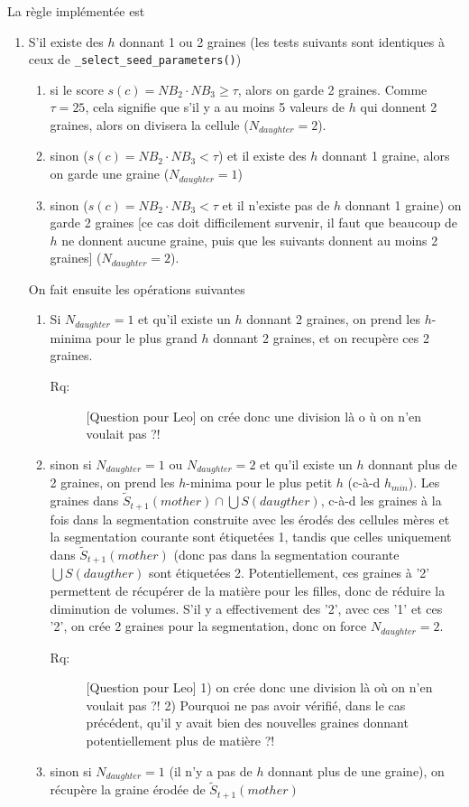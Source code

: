 \documentclass{article}
\newenvironment{remarque}{\color{red}\begin{description}\item[Rq:]}
{\end{description}\color{black}}
\begin{document}
La r\`egle impl\'ement\'ee est 
\begin{enumerate}
\itemsep -0.5ex
\item S'il existe des $h$ donnant 1 ou 2 graines (les tests suivants sont identiques \`a ceux de \verb|_select_seed_parameters()|)
\begin{enumerate}
\itemsep -0.5ex
\item si le score $s(c) = NB_2 \cdot NB_3 \geq \tau$, alors on garde 2 graines. Comme $\tau = 25$, cela signifie que s'il y a au moins 5 valeurs de $h$ qui donnent 2 graines, alors on divisera la cellule ($N_{daughter}=2$).
\item sinon ($s(c) = NB_2 \cdot NB_3 <\tau$) et il existe des $h$ donnant 1 graine, alors on garde une graine ($N_{daughter}=1$)
\item sinon ($s(c) = NB_2 \cdot NB_3 <\tau$ et il n'existe pas de $h$ donnant 1 graine) on garde 2 graines [ce cas doit difficilement survenir, il faut que beaucoup de $h$ ne donnent aucune graine, puis que les suivants donnent au moins 2 graines] ($N_{daughter}=2$).
\end{enumerate}

On fait ensuite les op\'erations suivantes
\begin{enumerate}
\itemsep -0.5ex
\item Si $N_{daughter}=1$ et qu'il existe un $h$ donnant 2 graines, on prend les $h$-minima pour le plus grand $h$ donnant 2 graines, et on recup\`ere ces 2 graines.
\begin{remarque} [Question pour Leo] on cr\'ee donc une division l\`a o \`u on n'en voulait pas ?!
\end{remarque}
\item sinon si $N_{daughter}=1$ ou $N_{daughter}=2$ et qu'il existe un $h$ donnant plus de 2 graines, on prend les $h$-minima pour le plus petit $h$ (c-\`a-d $h_{min}$).
Les graines dans $\tilde{S}_{t+1}(mother) \cap \bigcup S(daugther)$, c-\`a-d les graines \`a la fois dans la segmentation construite avec les \'erod\'es des cellules m\`eres et la segmentation courante sont \'etiquet\'ees 1, tandis que celles uniquement dans $\tilde{S}_{t+1}(mother)$ (donc pas dans la segmentation courante $\bigcup S(daugther)$ sont \'etiquet\'ees 2. Potentiellement, ces graines \`a '2' permettent de r\'ecup\'erer de la mati\`ere pour les filles, donc de r\'eduire la diminution de volumes.
S'il y a effectivement des '2',
avec ces '1' et ces '2', on cr\'ee 2 graines pour la segmentation, donc on force $N_{daughter}=2$.
\begin{remarque} [Question pour Leo] 1) on cr\'ee donc une division l\`a o\`u on n'en voulait pas ?! 2) Pourquoi ne pas avoir v\'erifi\'e, dans le cas pr\'ec\'edent, qu'il y avait bien des nouvelles graines donnant potentiellement plus de mati\`ere ?!
\end{remarque}
\item sinon si $N_{daughter}=1$ (il n'y a pas de $h$ donnant plus de une graine), on r\'ecup\`ere la graine \'erod\'ee de $\tilde{S}_{t+1}(mother)$
\end{enumerate}


\end{enumerate}
\end{document}
